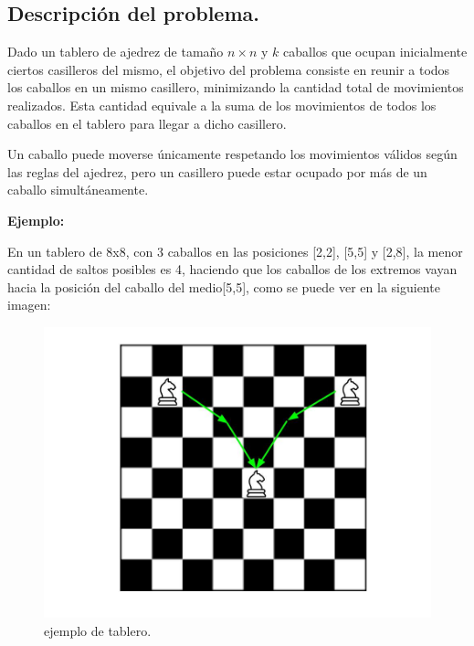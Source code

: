 \subsection{Descripción del problema.}

\vspace*{0.3cm}

Dado un tablero de ajedrez de tamaño $n \times n$ y $k$ caballos que ocupan
inicialmente ciertos casilleros del mismo, el objetivo del problema consiste
en reunir a todos los caballos en un mismo casillero, minimizando la
cantidad total de movimientos realizados. Esta cantidad equivale a la suma
de los movimientos de todos los caballos en el tablero para llegar a dicho
casillero.

Un caballo puede moverse únicamente respetando los movimientos válidos según
las reglas del ajedrez, pero un casillero puede estar ocupado por más de un
caballo simultáneamente.

\vspace*{0.5cm}

\textbf{Ejemplo:}

En un tablero de 8x8, con 3 caballos en las posiciones [2,2], [5,5] y [2,8],
la menor cantidad de saltos posibles es 4, haciendo que los caballos de los
extremos vayan hacia la posición del caballo del medio[5,5], como se puede ver
en la siguiente imagen:

\begin{figure}[htb]
  \begin{center}
      \includegraphics[scale=0.25]{imagenes/caballos.jpg}
  \end{center}
  \caption{ejemplo de tablero.}
\end{figure}



